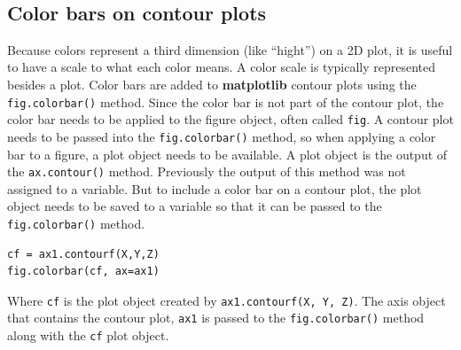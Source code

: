 \documentclass{book}
\begin{document}
    \begin{center}
    \end{center}
    { \hspace*{\fill} \\}
    

    
        \subsection{Color bars on contour
plots}\label{color-bars-on-contour-plots}
    




    
        Because colors represent a third dimension (like ``hight'') on a 2D
plot, it is useful to have a scale to what each color means. A color
scale is typically represented besides a plot. Color bars are added to
\textbf{matplotlib} contour plots using the \lstinline!fig.colorbar()!
method. Since the color bar is not part of the contour plot, the color
bar needs to be applied to the figure object, often called
\lstinline!fig!. A contour plot needs to be passed into the
\lstinline!fig.colorbar()! method, so when applying a color bar to a
figure, a plot object needs to be available. A plot object is the output
of the \lstinline!ax.contour()! method. Previously the output of this
method was not assigned to a variable. But to include a color bar on a
contour plot, the plot object needs to be saved to a variable so that it
can be passed to the \lstinline!fig.colorbar()! method.

\begin{lstlisting}
cf = ax1.contourf(X,Y,Z)
fig.colorbar(cf, ax=ax1)
\end{lstlisting}

Where \lstinline!cf! is the plot object created by
\lstinline!ax1.contourf(X, Y, Z)!. The axis object that contains the
contour plot, \lstinline!ax1! is passed to the
\lstinline!fig.colorbar()! method along with the \lstinline!cf! plot
object.
    
\end{document}

